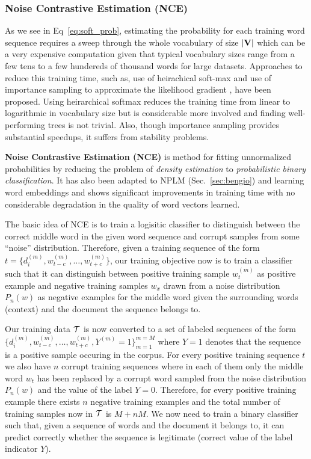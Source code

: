 \subsubsection{Noise Contrastive Estimation (NCE)}
As we see in Eq~\ref{eq:soft_prob}, estimating the probability for each training word sequence requires a sweep through the whole vocabulary of size $|\mathbf{V}|$ which can be a very expensive computation given that typical vocabulary sizes range from a few tens to a few hundereds of thousand words for large datasets. Approaches to reduce this training time, such as, use of heirachical soft-max \citep{morin2005hierarchical} and use of importance sampling to approximate the likelihood gradient \citep{bengio2003quick}, \citep{bengio2008adaptive} have been proposed. Using heirarchical softmax reduces the training time from linear to logarithmic in vocabulary size but is considerable more involved and finding well-performing trees is not trivial. Also, though importance sampling provides substantial speedups, it suffers from stability problems.

\textbf{Noise Contrastive Estimation (NCE)} \citep{gutmann2012noise} is method for fitting unnormalized probabilities by reducing the problem of \emph{density estimation} to \emph{probabilistic binary classification}. It has also been adapted to NPLM (Sec.~\ref{sec:bengio}) \citep{mnih2012fast} and learning word embeddings \cite{mnih2013learning} and shows significant improvements in training time with no considerable degradation in the quality of word vectors learned.

The basic idea of NCE is to train a logisitic classifier to distinguish between the correct middle word in the given word sequence and corrupt samples from some ``noise'' distribution. Therefore, given a training sequence of the form $t = \{d^{(m)}_{i}, w^{(m)}_{t-c}, \ldots, w^{(m)}_{t+c}\}$, our training objective now is to train a classifier such that it can distinguish between positive training sample $w^{(m)}_{t}$ as positive example and negative training samples $w_{x}$ drawn from a noise distribution $P_{n}(w)$ as negative examples for the middle word given the surrounding words (context) and the document the sequence belongs to.

Our training data $\mathcal{T}$ is now converted to a set of labeled sequences of the form 
$ \{d^{(m)}_{i}, w^{(m)}_{t-c}, \ldots, w^{(m)}_{t+c}, Y^{(m)}=1\}^{m=M}_{m=1} $
where $Y=1$ denotes that the sequence is a positive sample occuring in the corpus. For every positive training sequence $t$ we also have $n$ corrupt training sequences where in each of them only the middle word $w_{t}$ has been replaced by a corrupt word sampled from the noise distribution $P_{n}(w)$ and the value of the label $Y=0$. Therefore, for every positive training example there exists $n$ negative training examples and the total number of training samples now in $\mathcal{T}$ is $M + nM$. We now need to train a binary classifier such that, given a sequence of words and the document it belongs to, it can predict correctly whether the sequence is legitimate (correct value of the label indicator $Y$). 

